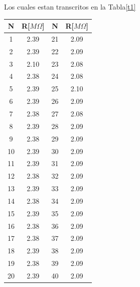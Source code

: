 \documentclass[11pt]{article}
\begin{document}
\begin{multicols}{2}
        Los cuales estan transcritos en la Tabla\ref{t1}

        \begin{center}
            \begin{tabular}{|c|c||c|c|}
                \hline
                N  & R[$M\Omega$] & N  & R[$M\Omega$] \\[0,1cm]
                \hline \hline
                1  & 2.39 & 21 & 2.09         \\ \hline
                2  & 2.39 & 22 & 2.09         \\ \hline
                3  & 2.10 & 23 & 2.08         \\ \hline
                4  & 2.38 & 24 & 2.08         \\ \hline
                5  & 2.39 & 25 & 2.10         \\ \hline
                6  & 2.39 & 26 & 2.09         \\ \hline
                7  & 2.38 & 27 & 2.08         \\ \hline
                8  & 2.39 & 28 & 2.09         \\ \hline
                9  & 2.38 & 29 & 2.09         \\ \hline
                10 & 2.39 & 30 & 2.09         \\ \hline
                11 & 2.39 & 31 & 2.09         \\ \hline
                12 & 2.38 & 32 & 2.09         \\ \hline
                13 & 2.39 & 33 & 2.09         \\ \hline
                14 & 2.38 & 34 & 2.09         \\ \hline
                15 & 2.39 & 35 & 2.09         \\ \hline
                16 & 2.38 & 36 & 2.09         \\ \hline
                17 & 2.38 & 37 & 2.09         \\ \hline
                18 & 2.39 & 38 & 2.09         \\ \hline
                19 & 2.38 & 39 & 2.09         \\ \hline
                20 & 2.39 & 40 & 2.09         \\ \hline
            \end{tabular}
            \label{t1}
        \end{center}

\end{multicols}
\end{document}
